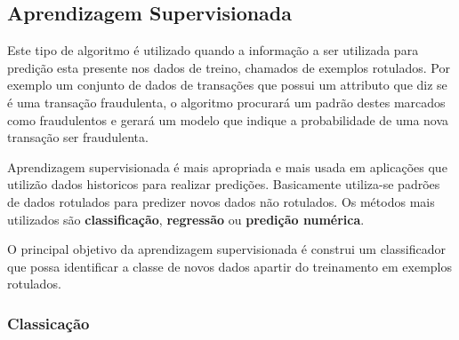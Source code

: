 \subsection{Aprendizagem Supervisionada}
\label{subsec:supervised-learning}
Este tipo de algoritmo é utilizado quando a informação a ser utilizada para predição esta presente nos dados de treino, chamados de 
exemplos rotulados. Por exemplo um conjunto de dados de transações que possui um attributo que diz se é uma transação fraudulenta, o 
algoritmo procurará um padrão destes marcados como fraudulentos e gerará um modelo que indique a probabilidade de uma nova transação 
ser fraudulenta.

Aprendizagem supervisionada é mais apropriada e mais usada em aplicações que utilizão dados historicos para realizar predições. 
Basicamente utiliza-se padrões de dados rotulados para predizer novos dados não rotulados. 
Os métodos mais utilizados são \textbf{classificação}, \textbf{regressão} ou \textbf{predição numérica}.

O principal objetivo da aprendizagem supervisionada é construi um classificador que possa identificar a classe de novos dados apartir
do treinamento em exemplos rotulados.     


\subsubsection{Classicação}
\label{subsubsec:classificacao}

